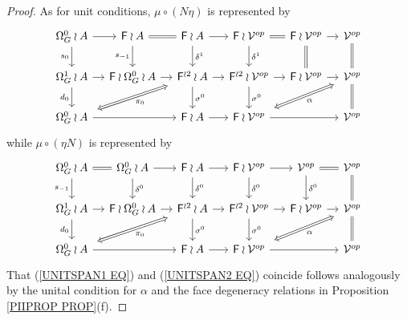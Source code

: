 \documentclass[a4paper,10pt]{article}%
\begin{document}
\begin{proof}
As for unit conditions, $\mu \circ (N \eta)$ is represented by
\begin{equation}\label{UNITSPAN1 EQ}
	\begin{tikzcd}[column sep=1.05em]
	\Omega_G^0 \wr A \ar{d}[swap]{s_{0}} \ar{r} &
	\Fin \wr A \ar{d}[swap]{s_{-1}} \ar[equal]{r} &
	\Fin \wr A \ar{d}{\delta^1} \ar{r} &
	\Fin \wr \mathcal{V}^{op} \ar{d}{\delta^1} \ar[equal]{r} &
	\Fin \wr \mathcal{V}^{op} \ar[equal]{d} \ar{r} &
	\mathcal{V}^{op} \ar[equal]{d}
\\
	\Omega_{G}^{1} \wr A \ar{r} \ar{d}[swap]{d_{0}}&
	\Fin \wr \Omega_{G}^{0} \wr A \ar{r} &
	|[alias=FFOmega]|\Fin^{\wr 2} \wr A \ar{d}{\sigma^0} \ar{r} &
	\Fin^{\wr 2} \wr \mathcal{V}^{op} \ar{d}{\sigma^0} \ar{r} &
	\Fin \wr \mathcal{V}^{op} \ar{r} &
	|[alias=dog]|
	\mathcal{V}^{op} \ar[equal]{d}
\\
	|[alias=Omega]|\Omega_{G}^0 \wr A \ar{rr}&&
	\Fin \wr A \ar{r} &
	|[alias=cat]|
	\Fin \wr \mathcal{V}^{op} \ar{rr} &&
	\mathcal{V}^{op}
	\arrow[Leftrightarrow, from=FFOmega, to=Omega,shorten <=0.15cm,,shorten >=0.15cm,"\pi_0"]
	\arrow[Leftrightarrow, from=dog, to=cat,shorten <=0.15cm,,shorten >=0.15cm,"\alpha"]
	\end{tikzcd}
\end{equation}
while $\mu \circ (\eta N)$ is represented by 
\begin{equation}\label{UNITSPAN2 EQ}
	\begin{tikzcd}[column sep=1.05em]
	\Omega_G^0 \wr A \ar{d}[swap]{s_{-1}} \ar[equal]{r} &
	\Omega_G^0 \wr A \ar{d}{\delta^0} \ar{r} &
	\Fin \wr A \ar{d}{\delta^0} \ar{r} &
	\Fin \wr \mathcal{V}^{op} \ar{d}{\delta^0} \ar{r} &
	\mathcal{V}^{op} \ar{d}{\delta^0} \ar[equal]{r} &
	\mathcal{V}^{op} \ar[equal]{d}
\\
	\Omega_{G}^{1} \wr A \ar{r} \ar{d}[swap]{d_{0}}&
	\Fin \wr \Omega_{G}^0 \wr A \ar{r} &
	|[alias=FFOmega]|\Fin^{\wr 2} \wr A \ar{d}{\sigma^0} \ar{r} &
	\Fin^{\wr 2} \wr \mathcal{V}^{op} \ar{d}{\sigma^0} \ar{r} &
	\Fin \wr \mathcal{V}^{op} \ar{r} &
	|[alias=dog]|
	\mathcal{V}^{op} \ar[equal]{d}
\\
	|[alias=Omega]|\Omega_{G}^0 \wr A \ar{rr} &&
	\Fin \wr A \ar{r} &
	|[alias=cat]|
	\Fin \wr \mathcal{V}^{op} \ar{rr} &&
	\mathcal{V}^{op}
	\arrow[Leftrightarrow, from=FFOmega, to=Omega,shorten <=0.15cm,,shorten >=0.15cm,"\pi_0"]
	\arrow[Leftrightarrow, from=dog, to=cat,shorten <=0.15cm,,shorten >=0.15cm,"\alpha"]
	\end{tikzcd}
\end{equation}
That (\ref{UNITSPAN1 EQ}) and (\ref{UNITSPAN2 EQ}) coincide follows analogously by the unital condition for $\alpha$
and the face degeneracy relations in 
Proposition \ref{PIIPROP PROP}(f).
\end{proof}
\end{document}

